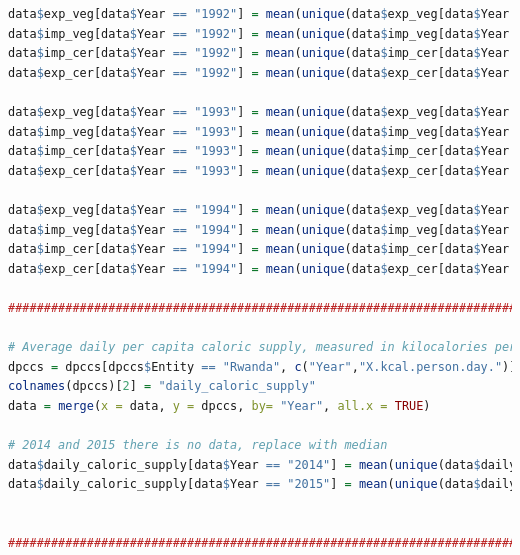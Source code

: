 \documentclass[11pt]{article}
\begin{document}
\begin{lstlisting}[language= R]
data$exp_veg[data$Year == "1992"] = mean(unique(data$exp_veg[data$Year %in% c("1996", "1997", "1998", "1999", "2000")]))
data$imp_veg[data$Year == "1992"] = mean(unique(data$imp_veg[data$Year %in% c("1996", "1997", "1998", "1999", "2000")]))
data$imp_cer[data$Year == "1992"] = mean(unique(data$imp_cer[data$Year %in% c("1996", "1997", "1998", "1999", "2000")]))
data$exp_cer[data$Year == "1992"] = mean(unique(data$exp_cer[data$Year %in% c("1996", "1997", "1998", "1999", "2000")]))

data$exp_veg[data$Year == "1993"] = mean(unique(data$exp_veg[data$Year %in% c("1997", "1998", "1999", "2000", "2001")]))
data$imp_veg[data$Year == "1993"] = mean(unique(data$imp_veg[data$Year %in% c("1997", "1998", "1999", "2000", "2001")]))
data$imp_cer[data$Year == "1993"] = mean(unique(data$imp_cer[data$Year %in% c("1997", "1998", "1999", "2000", "2001")]))
data$exp_cer[data$Year == "1993"] = mean(unique(data$exp_cer[data$Year %in% c("1997", "1998", "1999", "2000", "2001")]))

data$exp_veg[data$Year == "1994"] = mean(unique(data$exp_veg[data$Year %in% c("1998", "1999", "2000", "2001", "2002")]))
data$imp_veg[data$Year == "1994"] = mean(unique(data$imp_veg[data$Year %in% c("1998", "1999", "2000", "2001", "2002")]))
data$imp_cer[data$Year == "1994"] = mean(unique(data$imp_cer[data$Year %in% c("1998", "1999", "2000", "2001", "2002")]))
data$exp_cer[data$Year == "1994"] = mean(unique(data$exp_cer[data$Year %in% c("1998", "1999", "2000", "2001", "2002")]))

###################################################################################################################################

# Average daily per capita caloric supply, measured in kilocalories per person per day. 
dpccs = dpccs[dpccs$Entity == "Rwanda", c("Year","X.kcal.person.day.")]
colnames(dpccs)[2] = "daily_caloric_supply"
data = merge(x = data, y = dpccs, by= "Year", all.x = TRUE)

# 2014 and 2015 there is no data, replace with median 
data$daily_caloric_supply[data$Year == "2014"] = mean(unique(data$daily_caloric_supply[data$Year %in% c("2012", "2011", "2010", "2009", "2008")]))
data$daily_caloric_supply[data$Year == "2015"] = mean(unique(data$daily_caloric_supply[data$Year %in% c("2013" ,"2012", "2011", "2010", "2009")]))
                                                              

##################################################################################################################################


\end{lstlisting}
\end{document}
